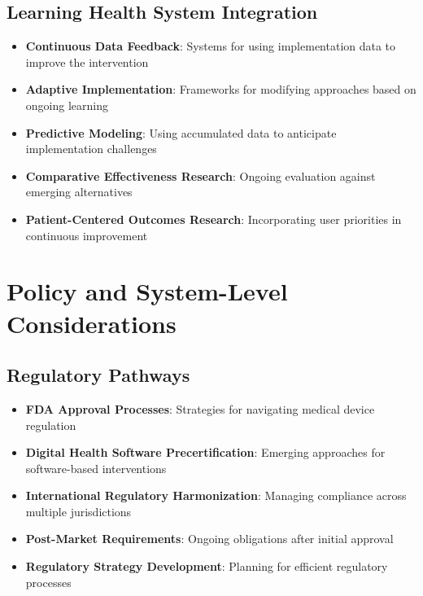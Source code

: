 \subsection{Learning Health System Integration}
\begin{itemize}
    \item \textbf{Continuous Data Feedback}: Systems for using implementation data to improve the intervention
    
    \item \textbf{Adaptive Implementation}: Frameworks for modifying approaches based on ongoing learning
    
    \item \textbf{Predictive Modeling}: Using accumulated data to anticipate implementation challenges
    
    \item \textbf{Comparative Effectiveness Research}: Ongoing evaluation against emerging alternatives
    
    \item \textbf{Patient-Centered Outcomes Research}: Incorporating user priorities in continuous improvement
\end{itemize}

\section{Policy and System-Level Considerations}
\subsection{Regulatory Pathways}
\begin{itemize}
    \item \textbf{FDA Approval Processes}: Strategies for navigating medical device regulation
    
    \item \textbf{Digital Health Software Precertification}: Emerging approaches for software-based interventions
    
    \item \textbf{International Regulatory Harmonization}: Managing compliance across multiple jurisdictions
    
    \item \textbf{Post-Market Requirements}: Ongoing obligations after initial approval
    
    \item \textbf{Regulatory Strategy Development}: Planning for efficient regulatory processes
\end{itemize}

